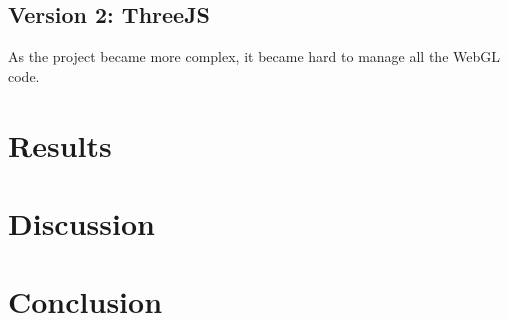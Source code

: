 \documentclass[]{article}
\begin{document}
\subsection{Version 2: ThreeJS}

As the project became more complex, it became hard to manage all the WebGL code.

\section{Results}

\section{Discussion}

\section{Conclusion}
\end{document}
